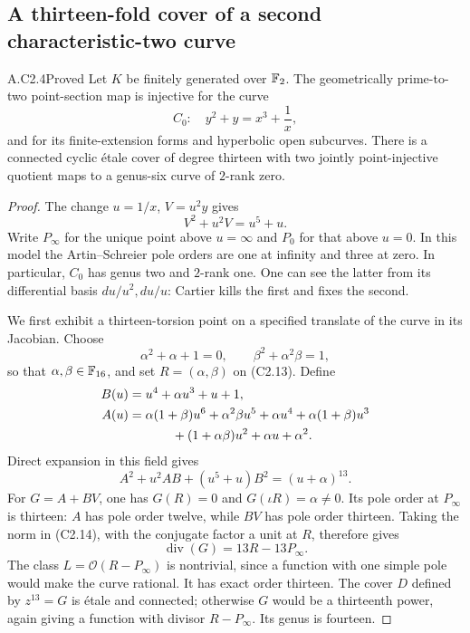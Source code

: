 \subsection{A thirteen-fold cover of a second characteristic-two curve}

\begin{claim}{A.C2.4}{Proved}
Let $K$ be finitely generated over $\mathbb F_2$. The geometrically
prime-to-two point-section map is injective for the curve
\[
                         C_0:\quad y^2+y=x^3+\frac1x,         \tag{C2.12}
\]
and for its finite-extension forms and hyperbolic open subcurves.
There is a connected cyclic \'etale cover of degree thirteen with
two jointly point-injective quotient maps to a genus-six curve of
$2$-rank zero.
\end{claim}
\begin{proof}
The change $u=1/x$, $V=u^2y$ gives
\[
                    V^2+u^2V=u^5+u.                         \tag{C2.13}
\]
Write $P_\infty$ for the unique point above $u=\infty$ and
$P_0$ for that above $u=0$. In this model the Artin--Schreier
pole orders are one at infinity and three at zero. In particular,
$C_0$ has genus two and $2$-rank one. One can see the latter
from its differential basis $du/u^2,du/u$: Cartier kills the
first and fixes the second.

We first exhibit a thirteen-torsion point on a specified translate
of the curve in its Jacobian. Choose
\[
 \alpha^2+\alpha+1=0,\qquad
 \beta^2+\alpha^2\beta=1,
\]
so that $\alpha,\beta\in\mathbb F_{16}$, and set $R=(\alpha,\beta)$
on (C2.13). Define
\[
 \begin{split}
 B(u)&=u^4+\alpha u^3+u+1,\\
 A(u)&=\alpha(1+\beta)u^6+\alpha^2\beta u^5+\alpha u^4
       +\alpha(1+\beta)u^3\\
     &\hspace{12mm}+(1+\alpha\beta)u^2+\alpha u+\alpha^2.
 \end{split}
\]
Direct expansion in this field gives
\[
 A^2+u^2AB+(u^5+u)B^2=(u+\alpha)^{13}.                        \tag{C2.14}
\]
For $G=A+BV$, one has $G(R)=0$ and
$G(\iota R)=\alpha\ne0$. Its pole order at $P_\infty$ is
thirteen: $A$ has pole order twelve, while $BV$ has pole
order thirteen. Taking the norm in (C2.14), with the conjugate
factor a unit at $R$, therefore gives
\[
                    \operatorname{div}(G)=13R-13P_\infty.
\]
The class $L=\mathcal O(R-P_\infty)$ is nontrivial, since a
function with one simple pole would make the curve rational.
It has exact order thirteen. The cover $D$ defined by $z^{13}=G$
is \'etale and connected; otherwise $G$ would be a thirteenth
power, again giving a function with divisor $R-P_\infty$.
Its genus is fourteen.


\end{proof}
